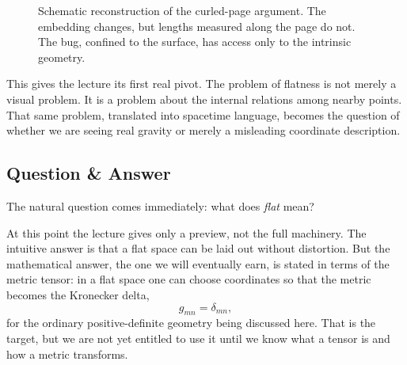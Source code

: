 \begin{figure}[t]
\centering
{}
\caption{Schematic reconstruction of the curled-page argument. The embedding changes, but lengths measured along the page do not. The bug, confined to the surface, has access only to the intrinsic geometry.}
\end{figure}

This gives the lecture its first real pivot. The problem of flatness is not merely a visual problem. It is a problem about the internal relations among nearby points. That same problem, translated into spacetime language, becomes the question of whether we are seeing real gravity or merely a misleading coordinate description.

\subsection{Question \& Answer}

The natural question comes immediately: what does \emph{flat} mean?

At this point the lecture gives only a preview, not the full machinery. The intuitive answer is that a flat space can be laid out without distortion. But the mathematical answer, the one we will eventually earn, is stated in terms of the metric tensor: in a flat space one can choose coordinates so that the metric becomes the Kronecker delta,
\begin{equation}
g_{mn}=\delta_{mn},
\end{equation}
for the ordinary positive-definite geometry being discussed here. That is the target, but we are not yet entitled to use it until we know what a tensor is and how a metric transforms.

